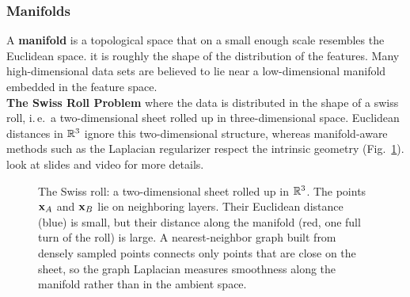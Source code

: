   \subsubsection{Manifolds}
  
  A   \textbf{manifold} is a topological space that on a small enough scale resembles  the Euclidean space. it is roughly the shape of the distribution of the features. Many high-dimensional data sets are believed to lie near a low-dimensional manifold embedded in the feature space. \\
\textbf{The Swiss Roll Problem} where the data is distributed in the shape of a swiss roll, i.\,e.\ a two-dimensional sheet rolled up in three-dimensional space. Euclidean distances in $\mathbb{R}^3$ ignore this two-dimensional structure, whereas manifold-aware methods such as the Laplacian regularizer respect the intrinsic geometry (Fig.~\ref{fig:swissroll}). look at slides and video for more details. 

  \begin{figure}[htbp]
    \centering
    \caption{The Swiss roll: a two-dimensional sheet rolled up in $\mathbb{R}^3$. The points $\bm{\mathrm{x}}_A$ and $\bm{\mathrm{x}}_B$ lie on neighboring layers. Their Euclidean distance (blue) is small, but their distance along the manifold (red, one full turn of the roll) is large. A nearest-neighbor graph built from densely sampled points connects only points that are close on the sheet, so the graph Laplacian measures smoothness along the manifold rather than in the ambient space.}
    \label{fig:swissroll}
  \end{figure}

